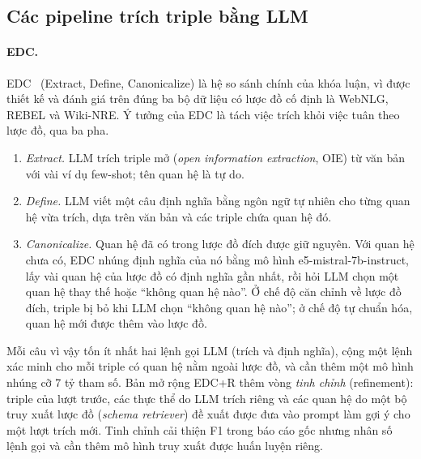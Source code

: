 \subsection{Các pipeline trích triple bằng LLM}

\paragraph*{EDC.}
EDC~\cite{zhang2024edc} (Extract, Define, Canonicalize) là hệ so sánh chính của khóa luận, vì được thiết kế và đánh giá trên đúng ba bộ dữ liệu có lược đồ cố định là WebNLG, REBEL và Wiki-NRE.
Ý tưởng của EDC là tách việc trích khỏi việc tuân theo lược đồ, qua ba pha.
\begin{enumerate}
  \item \emph{Extract.} LLM trích triple mở (\textit{open information extraction}, OIE) từ văn bản với vài ví dụ few-shot; tên quan hệ là tự do.
  \item \emph{Define.} LLM viết một câu định nghĩa bằng ngôn ngữ tự nhiên cho từng quan hệ vừa trích, dựa trên văn bản và các triple chứa quan hệ đó.
  \item \emph{Canonicalize.} Quan hệ đã có trong lược đồ đích được giữ nguyên. Với quan hệ chưa có, EDC nhúng định nghĩa của nó bằng mô hình e5-mistral-7b-instruct, lấy vài quan hệ của lược đồ có định nghĩa gần nhất, rồi hỏi LLM chọn một quan hệ thay thế hoặc ``không quan hệ nào''. Ở chế độ căn chỉnh về lược đồ đích, triple bị bỏ khi LLM chọn ``không quan hệ nào''; ở chế độ tự chuẩn hóa, quan hệ mới được thêm vào lược đồ.
\end{enumerate}
Mỗi câu vì vậy tốn ít nhất hai lệnh gọi LLM (trích và định nghĩa), cộng một lệnh xác minh cho mỗi triple có quan hệ nằm ngoài lược đồ, và cần thêm một mô hình nhúng cỡ 7 tỷ tham số.
Bản mở rộng EDC+R thêm vòng \emph{tinh chỉnh} (refinement): triple của lượt trước, các thực thể do LLM trích riêng và các quan hệ do một bộ truy xuất lược đồ (\textit{schema retriever}) đề xuất được đưa vào prompt làm gợi ý cho một lượt trích mới.
Tinh chỉnh cải thiện F1 trong báo cáo gốc nhưng nhân số lệnh gọi và cần thêm mô hình truy xuất được huấn luyện riêng.

